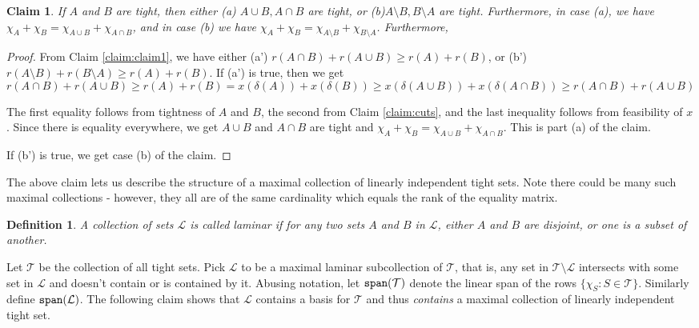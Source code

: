 \documentclass[11pt]{article}
\newtheorem{claim}{Claim}
\newtheorem{definition}{Definition}
\begin{document}
\begin{claim}\label{claim:tight}
If $A$ and $B$ are tight, then either (a)  $A\cup B,A\cap B$ are tight, or (b)$A\setminus B,B\setminus A$ are tight. Furthermore, in case (a), we have $\chi_A + \chi_B = \chi_{A\cup B} + \chi_{A\cap B}$, and in case (b) we have $\chi_A + \chi_B = \chi_{A\setminus B} + \chi_{B\setminus A}$.
Furthermore, 
\end{claim}
\begin{proof}
From Claim \ref{claim:claim1}, we have either 
(a') $r(A\cap B) + r(A\cup B) \ge r(A) + r(B)$, or (b') $r(A\setminus B) + r(B\setminus A) \ge r(A) + r(B)$.
If (a') is true, then we get
$$r(A\cap B) + r(A\cup B) \ge r(A) + r(B) = x(\delta(A)) + x(\delta(B)) \ge x(\delta(A\cup B)) + x(\delta(A\cap B))\ge r(A\cap B) + r(A\cup B) $$

The first equality follows from tightness of $A$ and $B$, the second from Claim \ref{claim:cuts}, and the last inequality follows from feasibility of $x$. Since there is equality everywhere, we get $A\cup B$ and $A\cap B$ are tight and $\chi_A + \chi_B = \chi_{A\cup B} + \chi_{A\cap B}$. This is part (a) of the claim.



If (b') is true, we get case (b) of the claim.
\end{proof}


\def\L{{\mathcal L}}
\def\T{{\mathcal T}}
\def\sp{{\tt span}}
 
\noindent
The above claim lets us describe the structure of a maximal collection of linearly independent tight sets. 
Note there could be many such maximal collections - however, they all are of the same cardinality which equals the rank of the equality matrix. 


\begin{definition}
A collection of sets $\L$ is called laminar if for any two sets $A$ and $B$ in $\L$, either $A$ and $B$ are disjoint, or one is a subset of another. 
\end{definition}


Let $\T$ be the collection of all tight sets. Pick $\L$ to be a maximal laminar subcollection of $\T$, that is, any set in $\T\setminus \L$ intersects with some set in $\L$ and doesn't contain or is contained by it. Abusing notation, let $\sp(\T)$ denote the linear span of the rows $\{\chi_S:S\in \T\}$. Similarly define $\sp(\L)$.
The following claim shows that $\L$ contains a basis for $\T$ and thus {\em contains} a maximal collection of linearly independent tight set.
\end{document}
